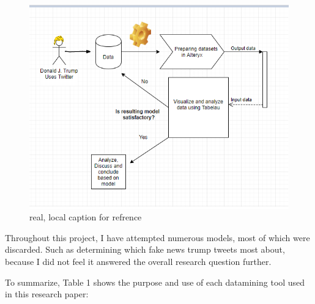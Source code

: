 \documentclass{article}
\begin{document}
\begin{figure}[H] %
	\centering %
\includegraphics [scale= .85]  {SygModel.PNG}    %
	\caption[Optional caption] {real, local caption for refrence}
	\label{fig:wordcloudBliz}

\end{figure}


Throughout this project, I have attempted numerous models, most of which were discarded. Such as determining which fake news trump tweets most about, because I did not feel it answered the overall research question further.











 To summarize, Table 1 shows the purpose and use of each datamining tool used in this research paper: 
\end{document}
